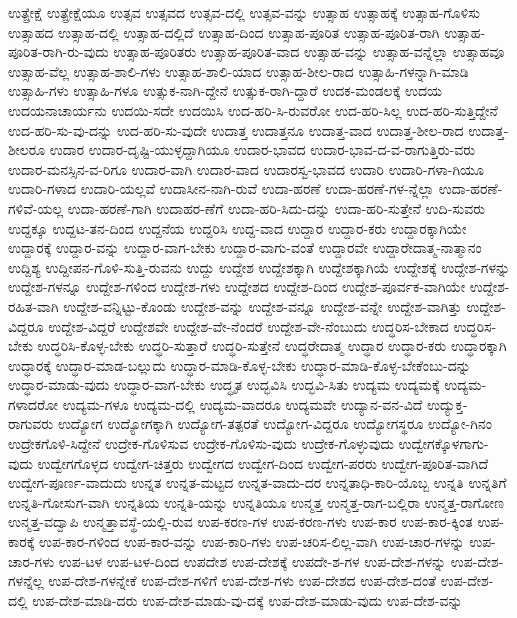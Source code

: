 {ಉತ್ಪ್ರೇಕ್ಷೆ
ಉತ್ಪ್ರೇಕ್ಷೆಯೂ
ಉತ್ಸವ
ಉತ್ಸವದ
ಉತ್ಸವ-ದಲ್ಲಿ
ಉತ್ಸವ-ವನ್ನು
ಉತ್ಸಾಹ
ಉತ್ಸಾಹಕ್ಕೆ
ಉತ್ಸಾಹ-ಗೊಳಿಸು
ಉತ್ಸಾಹದ
ಉತ್ಸಾಹ-ದಲ್ಲಿ
ಉತ್ಸಾಹ-ದಲ್ಲಿದೆ
ಉತ್ಸಾಹ-ದಿಂದ
ಉತ್ಸಾಹ-ಪೂರಿತ
ಉತ್ಸಾಹ-ಪೂರಿತ-ರಾಗಿ
ಉತ್ಸಾಹ-ಪೂರಿತ-ರಾಗಿ-ರು-ವುದು
ಉತ್ಸಾಹ-ಪೂರಿತರು
ಉತ್ಸಾಹ-ಪೂರಿತ-ವಾದ
ಉತ್ಸಾಹ-ವನ್ನು
ಉತ್ಸಾಹ-ವನ್ನೆಲ್ಲಾ
ಉತ್ಸಾಹವೂ
ಉತ್ಸಾಹ-ವೆಲ್ಲ
ಉತ್ಸಾಹ-ಶಾಲಿ-ಗಳು
ಉತ್ಸಾಹ-ಶಾಲಿ-ಯಾದ
ಉತ್ಸಾಹ-ಶೀಲ-ರಾದ
ಉತ್ಸಾಹಿ-ಗಳನ್ನಾಗಿ-ಮಾಡಿ
ಉತ್ಸಾಹಿ-ಗಳು
ಉತ್ಸಾಹಿ-ಗಳೂ
ಉತ್ಸುಕ-ನಾಗಿ-ದ್ದೇನೆ
ಉತ್ಸುಕ-ರಾಗಿ-ದ್ದಾರೆ
ಉದಕ-ಮಂಡಲಕ್ಕೆ
ಉದಯ
ಉದಯನಾಚಾರ್ಯನು
ಉದಯಿ-ಸದೇ
ಉದಯಿಸಿ
ಉದ-ಹರಿ-ಸಿ-ರುವರೋ
ಉದ-ಹರಿ-ಸಿಲ್ಲ
ಉದ-ಹರಿ-ಸುತ್ತಿದ್ದೇನೆ
ಉದ-ಹರಿ-ಸು-ವು-ದನ್ನು
ಉದ-ಹರಿ-ಸು-ವುದೇ
ಉದಾತ್ತ
ಉದಾತ್ತನೂ
ಉದಾತ್ತ-ವಾದ
ಉದಾತ್ತ-ಶೀಲ-ರಾದ
ಉದಾತ್ತ-ಶೀಲರೂ
ಉದಾರ
ಉದಾರ-ದೃಷ್ಟಿ-ಯುಳ್ಳದ್ದಾಗಿಯೂ
ಉದಾರ-ಭಾವದ
ಉದಾರ-ಭಾವ-ದ-ವ-ರಾಗುತ್ತಿರು-ವರು
ಉದಾರ-ಮನಸ್ಸಿನ-ವ-ರಿಗೂ
ಉದಾರ-ವಾಗಿ
ಉದಾರ-ವಾದ
ಉದಾರಸ್ವ-ಭಾವದ
ಉದಾರಿ
ಉದಾರಿ-ಗಳಾ-ಗಿಯೂ
ಉದಾರಿ-ಗಳಾದ
ಉದಾರಿ-ಯಲ್ಲವೆ
ಉದಾಸೀನ-ನಾಗಿ-ರುವೆ
ಉದಾ-ಹರಣೆ
ಉದಾ-ಹರಣೆ-ಗಳ-ನ್ನೆಲ್ಲಾ
ಉದಾ-ಹರಣೆ-ಗಳಿವೆ-ಯಲ್ಲ
ಉದಾ-ಹರಣೆ-ಗಾಗಿ
ಉದಾಹರ-ಣೆಗೆ
ಉದಾ-ಹರಿ-ಸಿದು-ದನ್ನು
ಉದಾ-ಹರಿ-ಸುತ್ತೇನೆ
ಉದಿ-ಸುವರು
ಉದ್ದಕ್ಕೂ
ಉದ್ದಟ-ತನ-ದಿಂದ
ಉದ್ದನೆಯ
ಉದ್ದರಿಸಿ
ಉದ್ದ-ವಾದ
ಉದ್ದಾರ
ಉದ್ದಾರ-ಕರು
ಉದ್ದಾರಕ್ಕಾಗಿಯೇ
ಉದ್ದಾರಕ್ಕೆ
ಉದ್ದಾರ-ವನ್ನು
ಉದ್ದಾರ-ವಾಗ-ಬೇಕು
ಉದ್ದಾರ-ವಾಗು-ವಂತೆ
ಉದ್ದಾರವೇ
ಉದ್ದಾರೇದಾತ್ಮ-ನಾತ್ಮಾನಂ
ಉದ್ದಿಶ್ಯ
ಉದ್ದೀಪನ-ಗೊಳಿ-ಸುತ್ತಿ-ರುವನು
ಉದ್ದು
ಉದ್ದೇಶ
ಉದ್ದೇಶಕ್ಕಾಗಿ
ಉದ್ದೇಶಕ್ಕಾಗಿಯೆ
ಉದ್ದೇಶಕ್ಕೆ
ಉದ್ದೇಶ-ಗಳನ್ನು
ಉದ್ದೇಶ-ಗಳನ್ನೂ
ಉದ್ದೇಶ-ಗಳಿಂದ
ಉದ್ದೇಶ-ಗಳು
ಉದ್ದೇಶದ
ಉದ್ದೇಶ-ದಿಂದ
ಉದ್ದೇಶ-ಪೂರ್ವಕ-ವಾಗಿಯೇ
ಉದ್ದೇಶ-ರಹಿತ-ವಾಗಿ
ಉದ್ದೇಶ-ವನ್ನಿಟ್ಟು-ಕೊಂಡು
ಉದ್ದೇಶ-ವನ್ನು
ಉದ್ದೇಶ-ವನ್ನೂ
ಉದ್ದೇಶ-ವನ್ನೇ
ಉದ್ದೇಶ-ವಾಗಿತ್ತು
ಉದ್ದೇಶ-ವಿದ್ದರೂ
ಉದ್ದೇಶ-ವಿದ್ದರೆ
ಉದ್ದೇಶವೇ
ಉದ್ದೇಶ-ವೇ-ನೆಂದರೆ
ಉದ್ದೇಶ-ವೇ-ನೆಂಬುದು
ಉದ್ಧರಿಸ-ಬೇಕಾದ
ಉದ್ಧರಿಸ-ಬೇಕು
ಉದ್ಧರಿಸಿ-ಕೊಳ್ಳ-ಬೇಕು
ಉದ್ಧರಿ-ಸುತ್ತಾರೆ
ಉದ್ಧರಿ-ಸುತ್ತೇನೆ
ಉದ್ಧರೇದಾತ್ಮ
ಉದ್ಧಾರ
ಉದ್ಧಾರ-ಕರು
ಉದ್ಧಾರಕ್ಕಾಗಿ
ಉದ್ಧಾರಕ್ಕೆ
ಉದ್ಧಾರ-ಮಾಡ-ಬಲ್ಲುದು
ಉದ್ಧಾರ-ಮಾಡಿ-ಕೊಳ್ಳ-ಬೇಕು
ಉದ್ಧಾರ-ಮಾಡಿ-ಕೊಳ್ಳ-ಬೇಕೆಂಬು-ದನ್ನು
ಉದ್ಧಾರ-ಮಾಡು-ವುದು
ಉದ್ಧಾರ-ವಾಗ-ಬೇಕು
ಉದ್ಧೃತ
ಉದ್ಭವಿಸಿ
ಉದ್ಭವಿ-ಸಿತು
ಉದ್ಯಮ
ಉದ್ಯಮಕ್ಕೆ
ಉದ್ಯಮ-ಗಳಾದರೋ
ಉದ್ಯಮ-ಗಳೂ
ಉದ್ಯಮ-ದಲ್ಲಿ
ಉದ್ಯಮ-ವಾದರೂ
ಉದ್ಯಮವೇ
ಉದ್ಯಾನ-ವನ-ವಿದೆ
ಉದ್ಯುಕ್ತ-ರಾಗುವರು
ಉದ್ಯೋಗ
ಉದ್ಯೋಗಕ್ಕಾಗಿ
ಉದ್ಯೋಗ-ತತ್ಪರತೆ
ಉದ್ಯೋಗ-ವಿದ್ದರೂ
ಉದ್ಯೋಗಸ್ಥರೂ
ಉದ್ಯೋ-ಗಿನಂ
ಉದ್ರೇಕಗೊಳಿ-ಸಿದ್ದೇನೆ
ಉದ್ರೇಕ-ಗೊಳಿಸುವ
ಉದ್ರೇಕ-ಗೊಳಿಸು-ವುದು
ಉದ್ರೇಕ-ಗೊಳ್ಳುವುದು
ಉದ್ವೇಗಕ್ಕೊಳಗಾಗು-ವುದು
ಉದ್ವೇಗಗೊಳ್ಳದ
ಉದ್ವೇಗ-ಚಿತ್ತರು
ಉದ್ವೇಗದ
ಉದ್ವೇಗ-ದಿಂದ
ಉದ್ವೇಗ-ಪರರು
ಉದ್ವೇಗ-ಪೂರಿತ-ವಾಗಿದೆ
ಉದ್ವೇಗ-ಪೂರ್ಣ-ವಾದುದು
ಉನ್ನತ
ಉನ್ನತ-ಮಟ್ಟದ
ಉನ್ನತ-ವಾದು-ದರ
ಉನ್ನತಾಧಿ-ಕಾರಿ-ಯೊಬ್ಬ
ಉನ್ನತಿ
ಉನ್ನತಿಗೆ
ಉನ್ನತಿ-ಗೋಸುಗ-ವಾಗಿ
ಉನ್ನತಿಯ
ಉನ್ನತಿ-ಯನ್ನು
ಉನ್ನತಿಯೂ
ಉನ್ಮತ್ತ
ಉನ್ಮತ್ತ-ರಾಗ-ಬಲ್ಲಿರಾ
ಉನ್ಮತ್ತ-ರಾಗೋಣ
ಉನ್ಮತ್ತ-ವದ್ವಾಪಿ
ಉನ್ಮತ್ತಾವಸ್ಥೆ-ಯಲ್ಲಿ-ರುವ
ಉಪ-ಕರಣ-ಗಳ
ಉಪ-ಕರಣ-ಗಳು
ಉಪ-ಕಾರ
ಉಪ-ಕಾರ-ಕ್ಕಿಂತ
ಉಪ-ಕಾರಕ್ಕೆ
ಉಪ-ಕಾರ-ಗಳಿಂದ
ಉಪ-ಕಾರ-ವನ್ನು
ಉಪ-ಕಾರಿ-ಗಳು
ಉಪ-ಚರಿಸ-ಲಿಲ್ಲ-ವಾಗಿ
ಉಪ-ಚಾರ-ಗಳನ್ನು
ಉಪ-ಚಾರ-ಗಳು
ಉಪ-ಟಳ
ಉಪ-ಟಳ-ದಿಂದ
ಉಪದೇಶ
ಉಪ-ದೇಶಕ್ಕೆ
ಉಪದೇ-ಶ-ಗಳ
ಉಪ-ದೇಶ-ಗಳನ್ನು
ಉಪ-ದೇಶ-ಗಳನ್ನೆಲ್ಲ
ಉಪ-ದೇಶ-ಗಳನ್ನೇಕೆ
ಉಪ-ದೇಶ-ಗಳಿಗೆ
ಉಪ-ದೇಶ-ಗಳು
ಉಪ-ದೇಶದ
ಉಪ-ದೇಶ-ದಂತೆ
ಉಪ-ದೇಶ-ದಲ್ಲಿ
ಉಪ-ದೇಶ-ಮಾಡಿ-ದರು
ಉಪ-ದೇಶ-ಮಾಡು-ವು-ದಕ್ಕೆ
ಉಪ-ದೇಶ-ಮಾಡು-ವುದು
ಉಪ-ದೇಶ-ವನ್ನು
}
